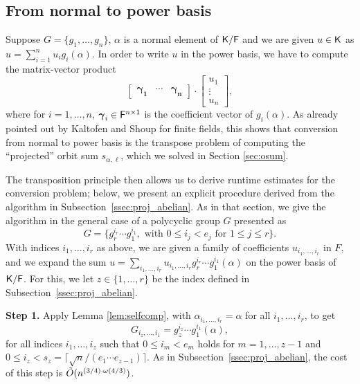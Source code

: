 \subsection{From normal to power basis} Suppose $G = \lbrace g_1, \ldots, g_n
\rbrace$, $\alpha$ is a normal element of ${\mathsf{K}}/{\mathsf{F}}$ and we are given $u\in {\mathsf{K}}$ 
as $u=\sum_{i=1}^n u_i g_i(\alpha)$. In order to write
$u $ in the power basis, we have to compute the matrix-vector 
product
\begin{equation}\label{eq:norm2pwrmat}
\left[\begin{array}{ccc}
\boldsymbol{ \gamma_1} & \cdots & \boldsymbol{ \gamma_n }
\end{array}\right]\cdot 
\begin{bmatrix}
u_1 \\ \vdots \\ u_n
\end{bmatrix},
\end{equation}
where for $i=1,\dots,n$, $\boldsymbol \gamma_i \in {\mathsf{F}}^{n\times 1}$ is
the coefficient vector of $g_i(\alpha)$. As already pointed out by
Kaltofen and Shoup for finite fields, this shows that conversion from normal to power
basis is the transpose problem of computing the ``projected'' orbit
sum $s_{\alpha,\ell}$, which we solved in Section \ref{sec:osum}. 

The transposition principle then allows us to derive runtime estimates
for the conversion problem; below, we present an explicit procedure
derived from the algorithm in Subsection~\ref{ssec:proj_abelian}.  As
in that section, we give the algorithm in the general case of a
polycyclic group $G$ presented as
\[
G =\{ g_r^{i_r} \cdots g_1^{i_1}, \text{~with~}  0 \leq i_j < e_j \text{~for~} 1 \leq j \leq r\}.
\]
With indices $i_1,\dots,i_r$ as above, we are given a family of 
coefficients $u_{i_1,\dots,i_r}$ in $F$, and we expand the sum
$u=\sum_{i_1,\dots,i_r} u_{i_1,\dots,i_r} g_r^{i_r} \cdots g_1^{i_1}(\alpha)$
on the power basis of ${\mathsf{K}}/{\mathsf{F}}$. For this, we let $z \in\{1,\dots,r\}$ be the index
defined in Subsection~\ref{ssec:proj_abelian}.

\smallskip\noindent \textbf{Step 1.} Apply Lemma \ref{lem:selfcomp},
with $\alpha_{i_1,\dots,i_r} = \alpha$ for all $i_1,\dots,i_r$, to get
$$ G_{i_z,\dots,i_1}=g_z^{i_z} \cdots
g_1^{i_1}(\alpha),$$ for all indices $i_1,\dots,i_z$ such that $0\leq
i_m < e_m$ holds for $m=1,\dots,z-1$ and $0\leq i_z <s_z=
\lceil{\sqrt{n}}/(e_1 \cdots e_{z-1})\rceil$.  As in
Subsection~\ref{ssec:proj_abelian}, the cost of this step is
$\tilde{O}(n^{(3/4)\cdot \omega(4/3)})$.

